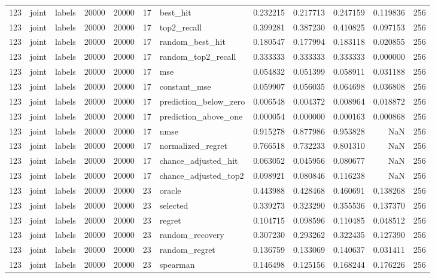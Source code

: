 \begin{tabular}{rllrrrlrrrrr}
123 & joint & labels & 20000 & 20000 & 17 & best_hit & 0.232215 & 0.217713 & 0.247159 & 0.119836 & 256 \\
123 & joint & labels & 20000 & 20000 & 17 & top2_recall & 0.399281 & 0.387230 & 0.410825 & 0.097153 & 256 \\
123 & joint & labels & 20000 & 20000 & 17 & random_best_hit & 0.180547 & 0.177994 & 0.183118 & 0.020855 & 256 \\
123 & joint & labels & 20000 & 20000 & 17 & random_top2_recall & 0.333333 & 0.333333 & 0.333333 & 0.000000 & 256 \\
123 & joint & labels & 20000 & 20000 & 17 & mse & 0.054832 & 0.051399 & 0.058911 & 0.031188 & 256 \\
123 & joint & labels & 20000 & 20000 & 17 & constant_mse & 0.059907 & 0.056035 & 0.064698 & 0.036808 & 256 \\
123 & joint & labels & 20000 & 20000 & 17 & prediction_below_zero & 0.006548 & 0.004372 & 0.008964 & 0.018872 & 256 \\
123 & joint & labels & 20000 & 20000 & 17 & prediction_above_one & 0.000054 & 0.000000 & 0.000163 & 0.000868 & 256 \\
123 & joint & labels & 20000 & 20000 & 17 & nmse & 0.915278 & 0.877986 & 0.953828 & NaN & 256 \\
123 & joint & labels & 20000 & 20000 & 17 & normalized_regret & 0.766518 & 0.732233 & 0.801310 & NaN & 256 \\
123 & joint & labels & 20000 & 20000 & 17 & chance_adjusted_hit & 0.063052 & 0.045956 & 0.080677 & NaN & 256 \\
123 & joint & labels & 20000 & 20000 & 17 & chance_adjusted_top2 & 0.098921 & 0.080846 & 0.116238 & NaN & 256 \\
123 & joint & labels & 20000 & 20000 & 23 & oracle & 0.443988 & 0.428468 & 0.460691 & 0.138268 & 256 \\
123 & joint & labels & 20000 & 20000 & 23 & selected & 0.339273 & 0.323290 & 0.355536 & 0.137370 & 256 \\
123 & joint & labels & 20000 & 20000 & 23 & regret & 0.104715 & 0.098596 & 0.110485 & 0.048512 & 256 \\
123 & joint & labels & 20000 & 20000 & 23 & random_recovery & 0.307230 & 0.293262 & 0.322435 & 0.127390 & 256 \\
123 & joint & labels & 20000 & 20000 & 23 & random_regret & 0.136759 & 0.133069 & 0.140637 & 0.031411 & 256 \\
123 & joint & labels & 20000 & 20000 & 23 & spearman & 0.146498 & 0.125156 & 0.168244 & 0.176226 & 256 \\

\end{tabular}
